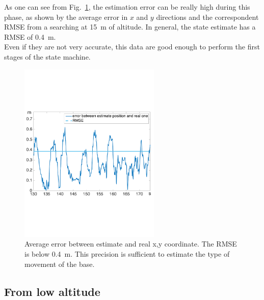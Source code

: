 As one can see from Fig.~\ref{fig:ekf_high_altitude_error}, the estimation error can be really high during this phase, as shown by the average error in $x$ and $y$ directions and the correspondent RMSE from a searching at \SI{15}{\meter} of altitude. In general, the state estimate has a RMSE of \SI{0.4}{\meter}.\\
Even if they are not very accurate, this data are good enough to perform the first stages of the state machine.
\begin{figure}[!ht]
    \centering
    \includegraphics[width=0.6\textwidth]{img/high_altitude_error.pdf}
      \caption{Average error between estimate and real x,y coordinate. The RMSE is below \SI{0.4}{\meter}. This precision is sufficient to estimate the type of movement of the base.}
    \label{fig:ekf_high_altitude_error}
\end{figure}


\subsection{From low altitude}
